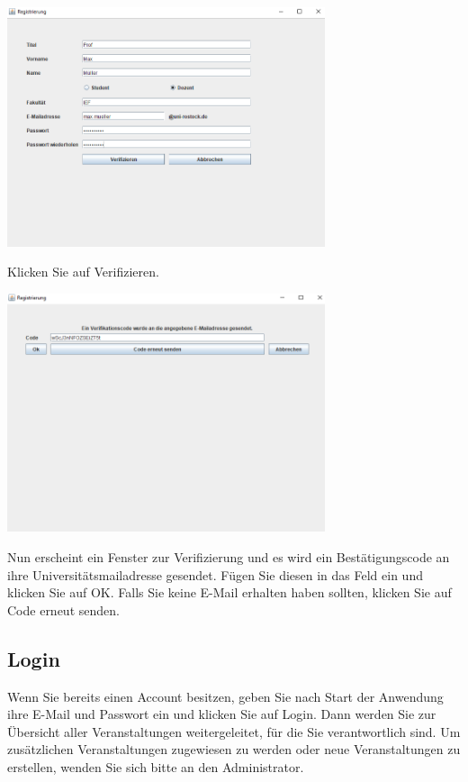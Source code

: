 \documentclass{Handbuch}
\begin{document}
\begin{center}
	\includegraphics[width=0.7\textwidth]{img_DozentenGUI_03.png}
\end{center}
Klicken Sie auf \frqq Verifizieren\flqq. 
\begin{center}
	\includegraphics[width=0.7\textwidth]{img_DozentenGUI_04.png}
\end{center}
Nun erscheint ein Fenster zur Verifizierung und es wird ein Bestätigungscode an ihre Universitätsmailadresse gesendet. Fügen Sie diesen in das Feld ein und klicken Sie auf \frqq OK\flqq.
Falls Sie keine E-Mail erhalten haben sollten, klicken Sie auf \frqq Code erneut senden\flqq. 

\subsection{Login}
Wenn Sie bereits einen Account besitzen, geben Sie nach Start der Anwendung ihre E-Mail und Passwort ein und klicken Sie auf \frqq Login\flqq. Dann werden Sie zur Übersicht aller Veranstaltungen weitergeleitet, für die Sie verantwortlich sind. Um zusätzlichen Veranstaltungen zugewiesen zu werden oder neue Veranstaltungen zu erstellen, wenden Sie sich bitte an den Administrator.
\end{document}
